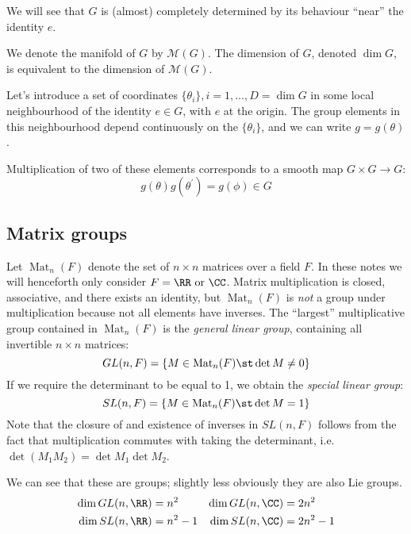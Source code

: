 \documentclass{jknotes}
\begin{document}
We will see that \(G\) is (almost) completely determined by its behaviour ``near'' the identity \(e\).

We denote the manifold of \(G\) by \(\mathcal{M}(G)\). The dimension of \(G\), denoted \(\dim G\), is equivalent to the dimension of \(\mathcal{M}(G)\).

Let's introduce a set of coordinates \(\{\theta_i\}, i = 1, \ldots, D = \dim G\) in some local neighbourhood of the identity \(e \in G\), with \(e\) at the origin. The group elements in this neighbourhood depend continuously on the \(\{\theta_i\}\), and we can write \(g=g(\theta)\).

Multiplication of two of these elements corresponds to a smooth map \(G \times G \rightarrow G\):
\begin{equation}
    g(\theta)g(\theta^\prime) = g(\phi) \in G
\end{equation}

\subsection{Matrix groups}
Let \(\operatorname{Mat}_n(F)\) denote the set of \(n \times n\) matrices over a field \(F\). In these notes we will henceforth only consider \(F = \RR \text{ or } \CC\). Matrix multiplication is closed, associative, and there exists an identity, but \(\operatorname{Mat}_n(F)\) is \emph{not} a group under multiplication because not all elements have inverses.
The ``largest'' multiplicative group contained in \(\operatorname{Mat}_n(F)\) is the \emph{general linear group}, containing all invertible \(n\times n\) matrices:
\begin{equation}
    GL(n,F) = \{M\in \operatorname{Mat}_n(F) \st \det M \ne 0 \}
\end{equation}
If we require the determinant to be equal to 1, we obtain the \emph{special linear group}:
\begin{equation}
    SL(n,F) = \{M\in \operatorname{Mat}_n(F) \st \det M = 1 \}
\end{equation}
Note that the closure of and existence of inverses in \(SL(n,F)\) follows from the fact that multiplication commutes with taking the determinant, i.e. \(\det(M_1M_2) = \det M_1 \det M_2\).

We can see that these are groups; slightly less obviously they are also Lie groups.
\begin{align}
    \dim GL(n,\RR) &= n^2 & \dim GL(n,\CC) &= 2n^2 \\
    \dim SL(n,\RR) &= n^2 - 1 & \dim SL(n,\CC) &= 2n^2 - 1
\end{align}
\end{document}
